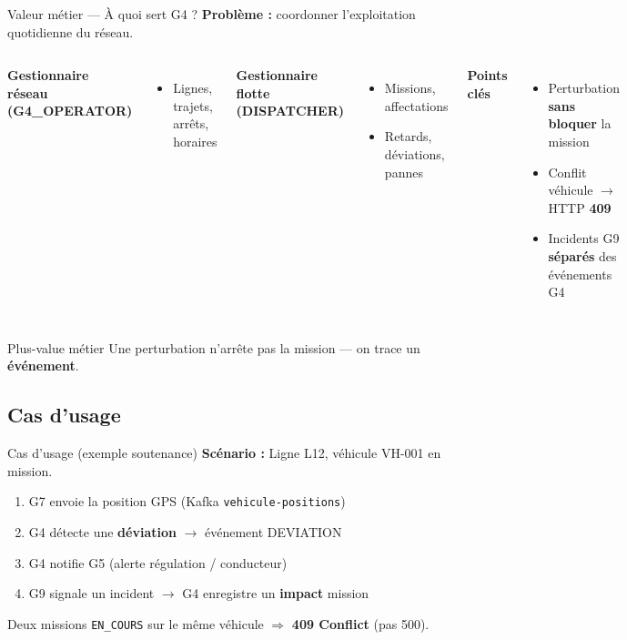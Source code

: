 \documentclass[aspectratio=169,xcolor=table]{beamer}
\begin{document}
\begin{frame}{Valeur métier — À quoi sert G4 ?}
  \textbf{Problème :} coordonner l'exploitation quotidienne du réseau.
  \vspace{0.3cm}
  \begin{columns}
    \textbf{Gestionnaire réseau (G4\_OPERATOR)}
    \begin{itemize}
      \item Lignes, trajets, arrêts, horaires
    \end{itemize}
    \vspace{0.2cm}
    \textbf{Gestionnaire flotte (DISPATCHER)}
    \begin{itemize}
      \item Missions, affectations
      \item Retards, déviations, pannes
    \end{itemize}
    \textbf{Points clés}
    \begin{itemize}
      \item Perturbation \textbf{sans bloquer} la mission
      \item Conflit véhicule $\rightarrow$ HTTP \textbf{409}
      \item Incidents G9 \textbf{séparés} des événements G4
    \end{itemize}
  \end{columns}
  \vspace{0.3cm}
  \begin{block}{Plus-value métier}
    Une perturbation n'arrête pas la mission — on trace un \textbf{événement}.
  \end{block}
\end{frame}

\subsection{Cas d'usage}

\begin{frame}{Cas d'usage (exemple soutenance)}
  \textbf{Scénario :} Ligne L12, véhicule VH-001 en mission.
  \begin{enumerate}
    \item G7 envoie la position GPS (Kafka \texttt{vehicule-positions})
    \item G4 détecte une \textbf{déviation} $\rightarrow$ événement DEVIATION
    \item G4 notifie G5 (alerte régulation / conducteur)
    \item G9 signale un incident $\rightarrow$ G4 enregistre un \textbf{impact} mission
  \end{enumerate}
  \vspace{0.2cm}
  \small Deux missions \texttt{EN\_COURS} sur le même véhicule $\Rightarrow$ \textbf{409 Conflict} (pas 500).
\end{frame}
\end{document}
